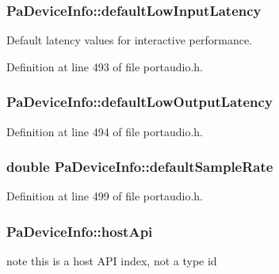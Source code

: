\subsubsection[{\texorpdfstring{default\+Low\+Input\+Latency}{defaultLowInputLatency}}]{ Pa\+Device\+Info\+::default\+Low\+Input\+Latency}\hypertarget{struct_pa_device_info_aad6629064b8c7cf043d237ea0a5cc534}{}\label{struct_pa_device_info_aad6629064b8c7cf043d237ea0a5cc534}
Default latency values for interactive performance. 

Definition at line 493 of file portaudio.\+h.

\subsubsection[{\texorpdfstring{default\+Low\+Output\+Latency}{defaultLowOutputLatency}}]{ Pa\+Device\+Info\+::default\+Low\+Output\+Latency}\hypertarget{struct_pa_device_info_a89e60515505eea8d668ede3a26a19ac6}{}\label{struct_pa_device_info_a89e60515505eea8d668ede3a26a19ac6}


Definition at line 494 of file portaudio.\+h.

\subsubsection[{\texorpdfstring{default\+Sample\+Rate}{defaultSampleRate}}]{\setlength{\rightskip}{0pt plus 5cm}double Pa\+Device\+Info\+::default\+Sample\+Rate}\hypertarget{struct_pa_device_info_a68f435353bfe1a4c9b632203a9afcacb}{}\label{struct_pa_device_info_a68f435353bfe1a4c9b632203a9afcacb}


Definition at line 499 of file portaudio.\+h.

\subsubsection[{\texorpdfstring{host\+Api}{hostApi}}]{ Pa\+Device\+Info\+::host\+Api}\hypertarget{struct_pa_device_info_afe741e4d185069577f7e74b78fdef5a4}{}\label{struct_pa_device_info_afe741e4d185069577f7e74b78fdef5a4}
note this is a host A\+PI index, not a type id 

